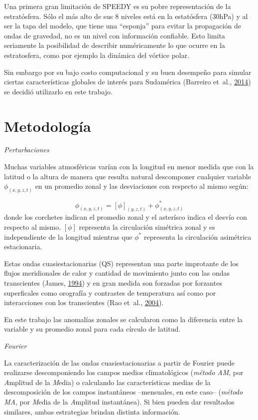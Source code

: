\documentclass[spanish,a4paper,12pt]{book}
\begin{document}
Una primera gran limitación de SPEEDY es su pobre representación de la
estratósfera. Sólo el más alto de sus 8 niveles está en la estatósfera
(30hPa) y al ser la tapa del modelo, que tiene una ``esponja'' para
evitar la propagación de ondas de gravedad, no es un nivel con
información confiable. Esto limita seriamente la posibilidad de
describir numéricamente lo que ocurre en la estratosfera, como por
ejemplo la dinámica del vórtice polar.

Sin embargo por su bajo costo computacional y su buen desempeño para
simular ciertas características globales de interés para Sudamérica
(Barreiro et~al., \protect\hyperlink{ref-Barreiro2014}{2014}) se decidió
utilizarlo en este trabajo.

\section{Metodología}\label{metodologia}

\emph{Perturbaciones}

Muchas variables atmosféricas varían con la longitud en menor medida que
con la latitud o la altura de manera que resulta natural descomponer
cualquier variable \(\phi_{(x, y, z, t)}\) en un promedio zonal y las
desviaciones con respecto al mismo según:

\[
\phi_{(x, y, z, t)} = [\phi]_{(y, z, t)} + \phi_{(x, y, z, t)}^*
\] donde los corchetes indican el promedio zonal y el asterísco indica
el desvío con respecto al mismo. \([\phi]\) representa la circulación
simétrica zonal y es independiente de la longitud mientras que
\(\phi^*\) representa la circulación asimétrica estacionaria.

Estas ondas cuasiestacionarias (QS) representan una parte improtante de
los flujos meridionales de calor y cantidad de movimiento junto con las
ondas transcientes (James, \protect\hyperlink{ref-James}{1994}) y en
gran medida son forzadas por forzantes superficales como orografía y
contrastes de temperatura así como por interacciones con los
transcientes (Rao et~al., \protect\hyperlink{ref-Rao2004}{2004}).

En este trabajo las anomalías zonales se calcularon como la diferencia
entre la variable y su promedio zonal para cada círculo de latitud.

\emph{Fourier}

La caracterización de las ondas cuasiestacionarias a partir de Fourier
puede realizarse descomponiendo los campos medios climatológicos
(\emph{método AM}, por \emph{A}mplitud de la \emph{M}edia) o calculando
las características medias de la descomposición de los campos
instantáneos --mensuales, en este caso-- (\emph{método MA}, por
\emph{M}edia de la \emph{A}mplitud instantánea). Si bien pueden dar
resultados similares, ambas estrategias brindan distinta información.
\end{document}
